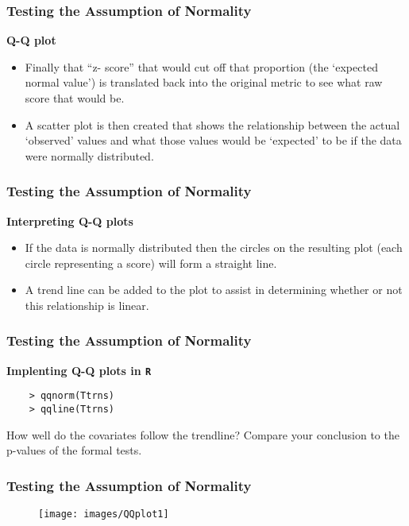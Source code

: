 \documentclass{beamer}
\begin{document}
		\begin{frame}
			\frametitle{Testing the Assumption of Normality}
			\Large		
			\textbf{Q-Q plot}
			\begin{itemize}		\item	Finally that “z- score” that would cut off that proportion (the `expected normal value') is translated back into the original metric to see what raw score that would be. 

				\item	A scatter plot is then created that shows the relationship between the actual `observed' values and what those values would be `expected' to be if the data were normally distributed. 
			\end{itemize}
		\end{frame}
		\begin{frame}
			\frametitle{Testing the Assumption of Normality}
			\Large		
			\textbf{Interpreting Q-Q plots}
			\begin{itemize}	
				\item	If the data is normally distributed then the circles on the resulting plot (each circle representing a score) will form a straight line. 
	\item	A trend line can be added to the plot to assist in determining whether or not this relationship is linear.
	\end{itemize}
		\end{frame}
		\begin{frame}[fragile]
			\frametitle{Testing the Assumption of Normality}
			\Large		
			\textbf{Implenting Q-Q plots in \texttt{R}}
	
	\begin{framed}
	\begin{verbatim}
	> qqnorm(Ttrns) 
	> qqline(Ttrns)
	\end{verbatim}
	\end{framed}
How well do the covariates follow the trendline? Compare your conclusion to the  p-values of the formal tests.
			\end{frame}
			\begin{frame}
				\frametitle{Testing the Assumption of Normality}
				\Large		
\begin{figure}
\centering
\texttt{[image: images/QQplot1]}

\end{figure}
\end{frame}
\end{document}
